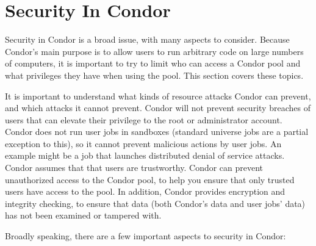 \section{\label{sec:Security}Security In Condor}

Security in Condor is a broad issue, with many aspects to consider.
Because Condor's main purpose is to allow users to run
arbitrary code on large numbers of computers,
it is important to try to
limit who can access a Condor pool and what privileges they have when
using the pool.
This section covers these topics. 

It is important to understand what kinds of resource attacks 
Condor can prevent, and which attacks it cannot prevent.
Condor will not prevent security breaches
of users
that can elevate their privilege to the root or
administrator account.
Condor does not run user jobs in sandboxes
(standard universe jobs are a partial exception to this),
so it cannot prevent
malicious actions by user jobs.
An example might be a job that launches distributed denial of service
attacks.
Condor assumes that that users are trustworthy.
Condor can
prevent unauthorized access to the Condor pool,
to help you ensure that only trusted users have access to the pool.
In addition,
Condor provides encryption and integrity checking,
to ensure that data
(both Condor's data and user jobs' data)
has not been examined or tampered with. 

Broadly speaking, there are a few important aspects to security in
Condor: 

